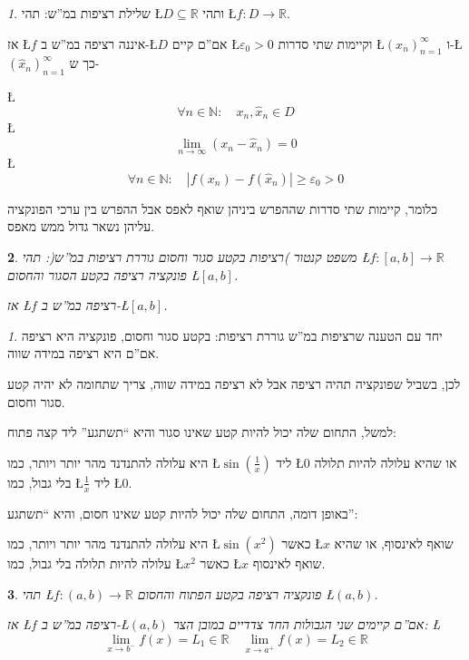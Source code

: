 \documentclass[english,hebrew]{article}
\theoremstyle{remark}
\newtheorem*{rem*}{\protect\remarkname}
\theoremstyle{definition}
\theoremstyle{plain}
\newtheorem{thm}{\protect\theoremname}
\theoremstyle{remark}
\newtheorem{claim}[thm]{\protect\claimname}
\theoremstyle{plain}
\theoremstyle{plain}
\providecommand{\claimname}{טענה}
\providecommand{\remarkname}{הערה}
\providecommand{\theoremname}{משפט}
\begin{document}
\begin{claim}
שלילת רציפות במ\textquotedblright ש: תהי \L{$D\subseteq\mathbb{R}$}
ותהי \L{$f:D\rightarrow\mathbb{R}$}.

אז \L{$f$} איננה רציפה במ\textquotedblright ש ב-\L{$D$} אם\textquotedblright ם
קיים \L{$\varepsilon_{0}>0$} וקיימות שתי סדרות \L{$\left(x_{n}\right)_{n=1}^{\infty}$}
ו-\L{$\left(\hat{x}_{n}\right)_{n=1}^{\infty}$} כך ש-

\L{%
\[
\forall n\in\mathbb{N}:\quad x_{n},\hat{x}_{n}\in D
\]
}%
\L{%
\[
\underset{n\rightarrow\infty}{\lim}\left(x_{n}-\hat{x}_{n}\right)=0
\]
}%
\L{%
\[
\forall n\in\mathbb{N}:\quad\left|f\left(x_{n}\right)-f\left(\hat{x}_{n}\right)\right|\ge\varepsilon_{0}>0
\]
}%

כלומר, קיימות שתי סדרות שההפרש ביניהן שואף לאפס אבל ההפרש בין ערכי
הפונקציה עליהן נשאר גדול ממש מאפס. 
\end{claim}

\begin{thm}
משפט קנטור )רציפות בקטע סגור וחסום גוררת רציפות במ\textquotedblright ש(:
תהי \L{$f:\left[a,b\right]\rightarrow\mathbb{R}$} פונקציה רציפה בקטע
הסגור והחסום \L{$\left[a,b\right]$}. 

אז \L{$f$} רציפה במ\textquotedblright ש ב-\L{$\left[a,b\right]$}.
\end{thm}

\begin{rem*}
יחד עם הטענה שרציפות במ\textquotedblright ש גוררת רציפות: בקטע סגור
וחסום, פונקציה היא רציפה אם\textquotedblright ם היא רציפה במידה שווה.

לכן, בשביל שפונקציה תהיה רציפה אבל לא רציפה במידה שווה, צריך שתחומה
לא יהיה קטע סגור וחסום.

למשל, התחום שלה יכול להיות קטע שאינו סגור והיא \textquotedblleft תשתגע\textquotedblright{}
ליד קצה פתוח:

היא עלולה להתנדנד מהר יותר ויותר, כמו \L{$\sin\left(\frac{1}{x}\right)$}
ליד \L{$0$} או שהיא עלולה להיות תלולה בלי גבול, כמו \L{$\frac{1}{x}$}
ליד \L{$0$}.

באופן דומה, התחום שלה יכול להיות קטע שאינו חסום, והיא \textquotedblleft תשתגע\textquotedblright :

היא עלולה להתנדנד מהר יותר ויותר, כמו \L{$\sin\left(x^{2}\right)$}
כאשר \L{$x$} שואף לאינסוף, או שהיא עלולה להיות תלולה בלי גבול, כמו
\L{$x^{2}$} כאשר \L{$x$} שואף לאינסוף.
\end{rem*}
\begin{thm}
תהי \L{$f:\left(a,b\right)\rightarrow\mathbb{R}$} פונקציה רציפה בקטע
הפתוח והחסום \L{$\left(a,b\right)$}.

אז \L{$f$} רציפה במ\textquotedblright ש ב-\L{$\left(a,b\right)$}
אם\textquotedblright ם קיימים שני הגבולות החד צדדיים במובן הצר: \L{%
\[
\underset{x\rightarrow b^{-}}{\lim}f(x)=L_{1}\in\mathbb{R}\quad\underset{x\rightarrow a^{+}}{\lim}f(x)=L_{2}\in\mathbb{R}
\]
}%
\end{thm}
\end{document}

